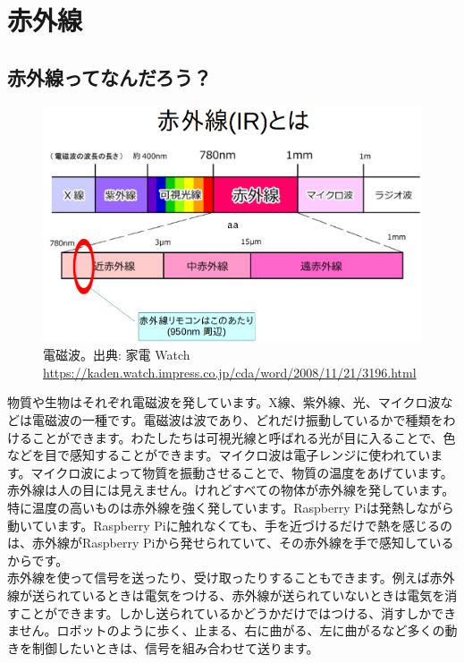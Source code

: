 \section{赤外線}
\subsection{赤外線ってなんだろう？}

\begin{figure}[H]
\centering
\includegraphics[scale=0.5]{images/chap05/text05-img036.png}
\caption{電磁波。出典: 家電 Watch \url{https://kaden.watch.impress.co.jp/cda/word/2008/11/21/3196.html} }

\end{figure}

物質や生物はそれぞれ電磁波を発しています。X線、紫外線、光、マイクロ波などは電磁波の一種です。電磁波は波であり、どれだけ振動しているかで種類をわけることができます。わたしたちは可視光線と呼ばれる光が目に入ることで、色などを目で感知することができます。マイクロ波は電子レンジに使われています。マイクロ波によって物質を振動させることで、物質の温度をあげています。\\

赤外線は人の目には見えません。けれどすべての物体が赤外線を発しています。特に温度の高いものは赤外線を強く発しています。Raspberry Piは発熱しながら動いています。Raspberry Piに触れなくても、手を近づけるだけで熱を感じるのは、赤外線がRaspberry Piから発せられていて、その赤外線を手で感知しているからです。\\

赤外線を使って信号を送ったり、受け取ったりすることもできます。例えば赤外線が送られているときは電気をつける、赤外線が送られていないときは電気を消すことができます。しかし送られているかどうかだけではつける、消すしかできません。ロボットのように歩く、止まる、右に曲がる、左に曲がるなど多くの動きを制御したいときは、信号を組み合わせて送ります。

